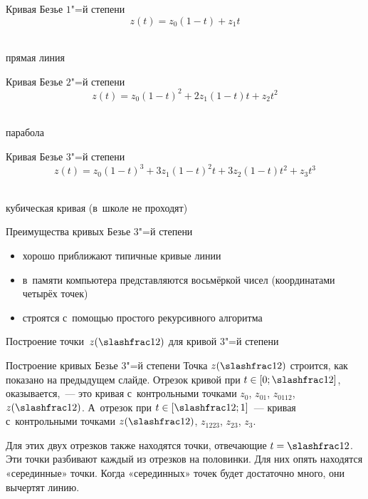
\begin{frame}{Кривая Безье $1$"=й степени}
{\Large
	\[
	z(t)=z_0(1-t)+z_1t
	\]}
\begin{center}
\\[4ex]
прямая линия
\end{center}
\end{frame}


\begin{frame}{Кривая Безье $2$"=й степени}
{\Large
	\[
	z(t)=z_0(1-t)^2+2z_1(1-t)t+z_2t^2
	\]}
\begin{center}
\\[4ex]
парабола
\end{center}
\end{frame}


\begin{frame}{Кривая Безье $3$"=й степени}
{\Large
	\[
	z(t)=z_0(1-t)^3+3z_1(1-t)^2t+3z_2(1-t)t^2+z_3t^3
	\]}
\begin{center}
\\[4ex]
кубическая кривая (в~школе не проходят)
\end{center}
\end{frame}


\begin{frame}{Преимущества кривых Безье $3$"=й степени}
\begin{itemize}
\item
хорошо приближают типичные кривые линии
\item
в~памяти компьютера представляются восьмёркой чисел (координатами четырёх
точек)
\item
строятся с~помощью простого рекурсивного алгоритма
\end{itemize}
\end{frame}


\begin{frame}{Построение точки~$z(\slashfrac12)$ для кривой $3$"=й степени}
\centering
{}
\end{frame}


\begin{frame}{Построение кривых Безье $3$"=й степени}
Точка $z(\slashfrac12)$ строится, как показано на предыдущем слайде. Отрезок
кривой при $t\in[0;\slashfrac12]$, оказывается,~— это кривая с~контрольными
точками $z_0$, $z_{01}$, $z_{0112}$, $z(\slashfrac12)$. А~отрезок при
$t\in[\slashfrac12;1]$~— кривая с~контрольными точками $z(\slashfrac12)$,
$z_{1223}$, $z_{23}$, $z_3$.

Для этих двух отрезков также находятся точки, отвечающие $t=\slashfrac12$. Эти
точки разбивают каждый из отрезков на половинки. Для них опять находятся
«серединные» точки. Когда «серединных» точек будет достаточно много, они
вычертят линию.
\end{frame}

